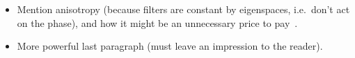 \begin{itemize}
    \item Mention anisotropy (because filters are constant by eigenspaces, i.e.\ don't act on the phase), and how it might be an unnecessary price to pay~\cite{defferrard2020deepsphere}.
    \item More powerful last paragraph (must leave an impression to the reader).
\end{itemize}
\clearpage
